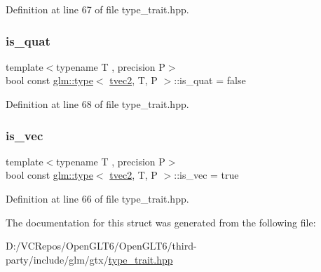 Definition at line 67 of file type\+\_\+trait.\+hpp.

\mbox{\label{structglm_1_1type_3_01tvec2_00_01_t_00_01_p_01_4_afd8565961dba49d7045fd9c53a7b71d1}} 
\subsubsection{\texorpdfstring{is\_quat}{is\_quat}}
{\footnotesize\ttfamily template$<$typename T , precision P$>$ \\
bool const \mbox{\hyperlink{structglm_1_1type}{glm\+::type}}$<$ \mbox{\hyperlink{structglm_1_1tvec2}{tvec2}}, T, P $>$\+::is\+\_\+quat = false\hspace{0.3cm}{\ttfamily [static]}}



Definition at line 68 of file type\+\_\+trait.\+hpp.

\mbox{\label{structglm_1_1type_3_01tvec2_00_01_t_00_01_p_01_4_aed111ecdb903d7e207978088eeeec8de}} 
\subsubsection{\texorpdfstring{is\_vec}{is\_vec}}
{\footnotesize\ttfamily template$<$typename T , precision P$>$ \\
bool const \mbox{\hyperlink{structglm_1_1type}{glm\+::type}}$<$ \mbox{\hyperlink{structglm_1_1tvec2}{tvec2}}, T, P $>$\+::is\+\_\+vec = true\hspace{0.3cm}{\ttfamily [static]}}



Definition at line 66 of file type\+\_\+trait.\+hpp.



The documentation for this struct was generated from the following file\+:\begin{DoxyCompactItemize}
\item 
D\+:/\+V\+C\+Repos/\+Open\+G\+L\+T6/\+Open\+G\+L\+T6/third-\/party/include/glm/gtx/\mbox{\hyperlink{type__trait_8hpp}{type\+\_\+trait.\+hpp}}\end{DoxyCompactItemize}
